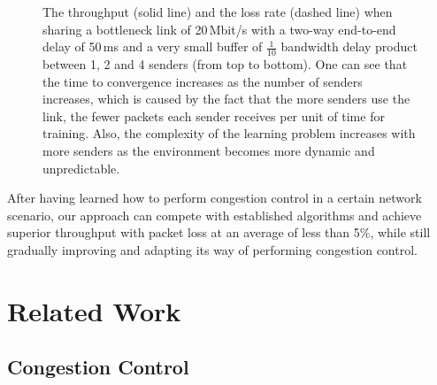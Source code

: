 \documentclass[sigconf]{acmart}
\begin{document}
\begin{figure}
\begin{minipage}{\columnwidth}
\caption{The throughput (solid line) and the loss rate (dashed line) when sharing a bottleneck link of 20\,Mbit/s with a two-way end-to-end delay of 50\,ms and a very small buffer of $\frac{1}{10}$ bandwidth delay product between 1, 2 and 4 senders (from top to bottom). One can see that the time to convergence increases as the number of senders increases, which is caused by the fact that the more senders use the link, the fewer packets each sender receives per unit of time for training. Also, the complexity of the learning problem increases with more senders as the environment becomes more dynamic and unpredictable.}
\label{fig:demo}
\end{minipage}
\end{figure}

After having learned how to perform congestion control in a certain network scenario, our approach can compete with established algorithms and achieve superior throughput with packet loss at an average of less than 5\%, while still gradually improving and adapting its way of performing congestion control.

\section{Related Work}

\subsection{Congestion Control}
\end{document}
